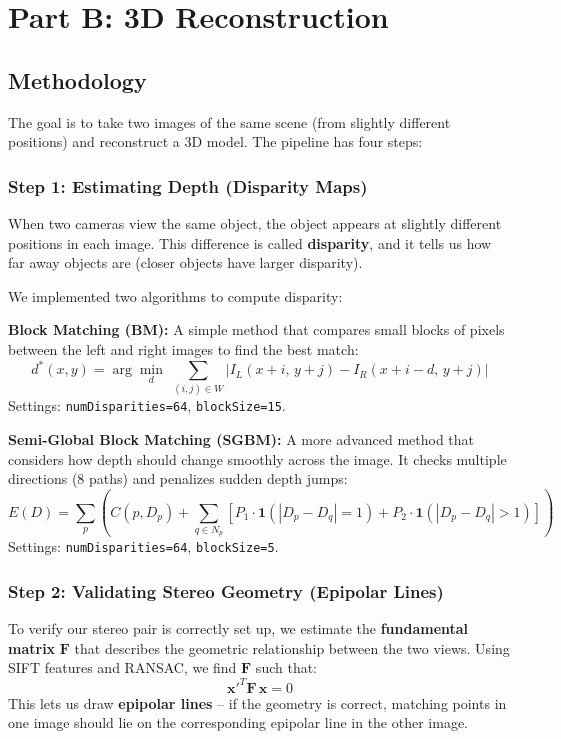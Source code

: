 \documentclass[a4paper,12pt]{article}
\begin{document}
\section{Part B: 3D Reconstruction}
\subsection{Methodology}

The goal is to take two images of the same scene (from slightly different positions) and reconstruct a 3D model. The pipeline has four steps:

\subsubsection*{Step 1: Estimating Depth (Disparity Maps)}

When two cameras view the same object, the object appears at slightly different positions in each image. This difference is called \textbf{disparity}, and it tells us how far away objects are (closer objects have larger disparity).

We implemented two algorithms to compute disparity:

\textbf{Block Matching (BM):} A simple method that compares small blocks of pixels between the left and right images to find the best match:
\[
    d^{*}(x,y) = \arg\min_{d}\;\sum_{(i,j)\in W} \bigl|I_L(x+i,\,y+j) - I_R(x+i-d,\,y+j)\bigr|
\]
Settings: \texttt{numDisparities=64}, \texttt{blockSize=15}.

\textbf{Semi-Global Block Matching (SGBM):} A more advanced method that considers how depth should change smoothly across the image. It checks multiple directions (8 paths) and penalizes sudden depth jumps:
\[
    E(D) = \sum_{p}\left(C(p, D_p) + \sum_{q\in N_p}\left[P_1\cdot\mathbf{1}(|D_p-D_q|=1) + P_2\cdot\mathbf{1}(|D_p-D_q|>1)\right]\right)
\]
Settings: \texttt{numDisparities=64}, \texttt{blockSize=5}.

\subsubsection*{Step 2: Validating Stereo Geometry (Epipolar Lines)}

To verify our stereo pair is correctly set up, we estimate the \textbf{fundamental matrix} $\mathbf{F}$ that describes the geometric relationship between the two views. Using SIFT features and RANSAC, we find $\mathbf{F}$ such that:
\[
    \mathbf{x'}^T \mathbf{F}\, \mathbf{x} = 0
\]
This lets us draw \textbf{epipolar lines} -- if the geometry is correct, matching points in one image should lie on the corresponding epipolar line in the other image.
\end{document}
